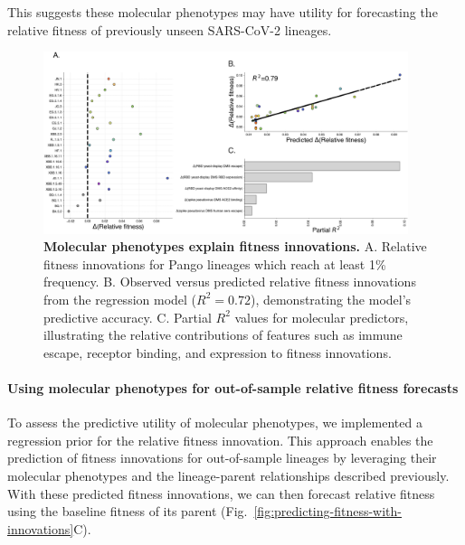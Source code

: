 This suggests these molecular phenotypes may have utility for forecasting the relative fitness of previously unseen SARS-CoV-2 lineages.

\begin{figure}[h]
	\centering
	\includegraphics[width=0.95\textwidth]{./figures/explaining-fitness-innovations.png}
	\caption[\textbf{Molecular phenotypes explain fitness innovations.}]{
	    \textbf{Molecular phenotypes explain fitness innovations.}
	    A. Relative fitness innovations for Pango lineages which reach at least 1\% frequency.
	    B. Observed versus predicted relative fitness innovations from the regression model ($R^2 = 0.72$), demonstrating the model’s predictive accuracy.
	    C. Partial $R^2$ values for molecular predictors, illustrating the relative contributions of features such as immune escape, receptor binding, and expression to fitness innovations.
	}
	\label{fig:explaining-fitness-innovations}
\end{figure}

\paragraph{Using molecular phenotypes for out-of-sample relative fitness forecasts}

To assess the predictive utility of molecular phenotypes, we implemented a regression prior for the relative fitness innovation. This approach enables the prediction of fitness innovations for out-of-sample lineages by leveraging their molecular phenotypes and the lineage-parent relationships described previously.
With these predicted fitness innovations, we can then forecast relative fitness using the baseline fitness of its parent (Fig.~\ref{fig:predicting-fitness-with-innovations}C).

